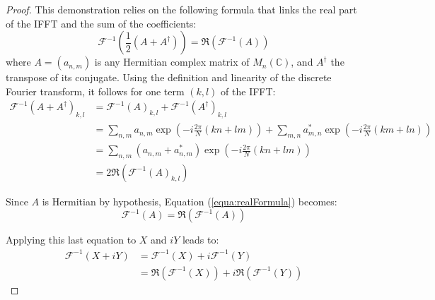 \documentclass[final]{jcgt}
\begin{document}
\begin{proof}
	This demonstration relies on the following formula that links the real part of the IFFT and the sum of the coefficients:
	\begin{equation}
		\label{equa:realFormula}
		\mathcal{F}^{-1}\left(\frac{1}{2}\left(A+A^{\dagger}\right)\right) =
		\Re\left(\mathcal{F}^{-1}\left(A\right)\right)
	\end{equation}
	where $A=(a_{n,m})$ is any Hermitian complex matrix of $M_n(\mathbb{C})$, and $A^{\dagger}$ the transpose of its conjugate.
	Using the definition and linearity of the discrete Fourier transform, it follows for one term $(k,l)$ of the IFFT:
	\begin{align}
		\mathcal{F}^{-1}\left(A+A^{\dagger}\right)_{k,l} & =
		\mathcal{F}^{-1}\left(A\right)_{k,l} + \mathcal{F}^{-1}\left(A^{\dagger}\right)_{k,l}\nonumber                                                                                                                  \\
		                                                 & =\sum_{n,m}a_{n,m}\exp\left(-i\frac{2\pi}{N}\left(kn+lm\right)\right) + \sum_{m,n}a_{m,n}^{\ast}\exp\left(-i\frac{2\pi}{N}\left(km+ln\right)\right)\nonumber \\
		                                                 & =\sum_{n,m}(a_{n,m}+a_{n,m}^{\ast})\exp\left(-i\frac{2\pi}{N}\left(kn+lm\right)\right)\nonumber                                                              \\
		                                                 & = 2\Re\left(\mathcal{F}^{-1}\left(A\right)_{k,l}\right)
	\end{align}

	Since $A$ is Hermitian by hypothesis, Equation (\ref{equa:realFormula}) becomes:
	\begin{equation}
		\mathcal{F}^{-1}\left(A\right) = \Re\left(\mathcal{F}^{-1}\left(A\right)\right)
	\end{equation}

	Applying this last equation to $X$ and $iY$ leads to:
	\begin{equation}
		\begin{aligned}
			\mathcal{F}^{-1}\left(X+iY\right) & =
			\mathcal{F}^{-1}\left(X\right) + i\mathcal{F}^{-1}\left(Y\right)                                                                       \\
			                                  & = \Re\left(\mathcal{F}^{-1}\left(X\right)\right) + i\Re\left(\mathcal{F}^{-1}\left(Y\right)\right)
		\end{aligned}
	\end{equation}


\end{proof}
\end{document}
